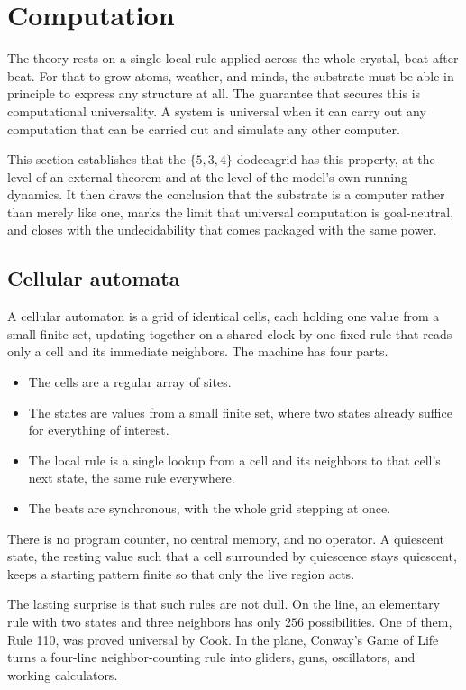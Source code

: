 \section{Computation}

The theory rests on a single local rule applied across the whole crystal, beat after beat. For that to
grow atoms, weather, and minds, the substrate must be able in principle to express any structure at all.
The guarantee that secures this is computational universality. A system is universal when it can carry out
any computation that can be carried out and simulate any other computer.

This section establishes that the
$\{5,3,4\}$ dodecagrid has this property, at the level of an external theorem and at the level of the
model's own running dynamics. It then draws the conclusion that the substrate is a computer rather than
merely like one, marks the limit that universal computation is goal-neutral, and closes with the
undecidability that comes packaged with the same power.

\subsection{Cellular automata}

A cellular automaton is a grid of identical cells, each holding one value from a small finite set, updating
together on a shared clock by one fixed rule that reads only a cell and its immediate neighbors. The
machine has four parts.
\begin{itemize}
  \item The cells are a regular array of sites.
  \item The states are values from a small finite set, where two states already suffice for everything of interest.
  \item The local rule is a single lookup from a cell and its neighbors to that cell's next state, the same rule everywhere.
  \item The beats are synchronous, with the whole grid stepping at once.
\end{itemize}
There is no program counter, no central memory, and no operator. A
quiescent state, the resting value such that a cell surrounded by quiescence stays quiescent, keeps a
starting pattern finite so that only the live region acts.

The lasting surprise is that such rules are not dull. On the line, an elementary rule with two states and
three neighbors has only $256$ possibilities. One of them, Rule 110, was proved universal by Cook. In the
plane, Conway's Game of Life turns a four-line neighbor-counting rule into gliders, guns, oscillators, and
working calculators.

